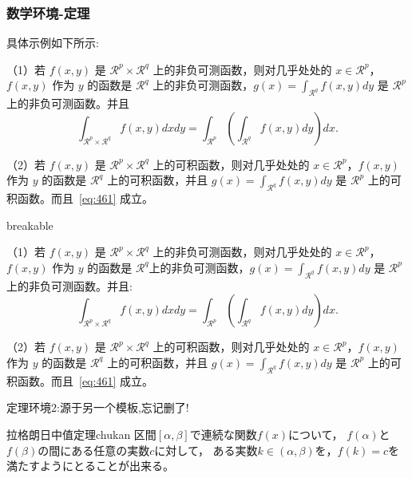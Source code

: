 \subsubsection{数学环境-定理}
具体示例如下所示:
\begin{theorem}[Fubini 定理] \label{thm:fubi} 
（1）若 $f(x,y)$ 是 $\mathcal{R}^p\times\mathcal{R}^q$ 上的非负可测函数，则对几乎处处的 $x\in \mathcal{R}^p$，$f(x,y)$ 作为 $y$ 的函数是 $\mathcal{R}^q$ 上的非负可测函数，$g(x)=\int_{\mathcal{R}^q}f(x,y) dy$ 是 $\mathcal{R}^p$ 上的非负可测函数。并且
\begin{equation}
\label{eq:461}
\int_{\mathcal{R}^p\times\mathcal{R}^q} f(x,y) dxdy=\int_{\mathcal{R}^p}\left(\int_{\mathcal{R}^q}f(x,y)dy\right)dx.
\end{equation}

（2）若 $f(x,y)$ 是 $\mathcal{R}^p\times\mathcal{R}^q$ 上的可积函数，则对几乎处处的 $x\in\mathcal{R}^p$，$f(x,y)$ 作为 $y$ 的函数是 $\mathcal{R}^q$ 上的可积函数，并且 $g(x)=\int_{\mathcal{R}^q}f(x,y) dy$ 是 $\mathcal{R}^p$ 上的可积函数。而且~\ref{eq:461} 成立。
\end{theorem}
\begin{tcblisting}{breakable}
\begin{theorem}[Fubini 定理] \label{thm:fubi} 
    （1）若 $f(x,y)$ 是 $\mathcal{R}^p\times\mathcal{R}^q$ 上的非负可测函数，则对几乎处处的 $x\in \mathcal{R}^p$，$f(x,y)$ 作为 $y$ 的函数是 $\mathcal{R}^q$上的非负可测函数，$g(x)=\int_{\mathcal{R}^q}f(x,y) dy$ 是 $\mathcal{R}^p$ 上的非负可测函数。并且:
    \begin{equation}
        \label{eq:461}
        \int_{\mathcal{R}^p\times\mathcal{R}^q} f(x,y) dxdy=\int_{\mathcal{R}^p}\left(\int_{\mathcal{R}^q}f(x,y)dy\right)dx.
    \end{equation}
    
    （2）若 $f(x,y)$ 是 $\mathcal{R}^p\times\mathcal{R}^q$ 上的可积函数，则对几乎处处的 $x\in\mathcal{R}^p$，$f(x,y)$ 作为 $y$ 的函数是 $\mathcal{R}^q$ 上的可积函数，并且 $g(x)=\int_{\mathcal{R}^q}f(x,y) dy$ 是 $\mathcal{R}^p$ 上的可积函数。而且~\ref{eq:461} 成立。
\end{theorem}
\end{tcblisting}
定理环境2:源于另一个模板,忘记删了!
\begin{mytheo}{拉格朗日中值定理}{chukan}
    区間$[\alpha,\beta]$で連続な関数$f(x)$について，
    $f(\alpha)$と$f(\beta)$の間にある任意の実数$c$に対して，
    ある実数$k\in (\alpha,\beta)$を，$f(k)=c$を
    満たすようにとることが出来る。
\end{mytheo}

